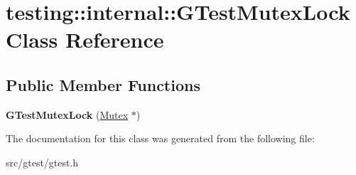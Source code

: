 \hypertarget{classtesting_1_1internal_1_1_g_test_mutex_lock}{}\section{testing\+:\+:internal\+:\+:G\+Test\+Mutex\+Lock Class Reference}
\label{classtesting_1_1internal_1_1_g_test_mutex_lock}
\subsection*{Public Member Functions}
\begin{DoxyCompactItemize}
\item 
\mbox{\label{classtesting_1_1internal_1_1_g_test_mutex_lock_a77e3cba326d5356b4a1dea3790559c26}} 
{\bfseries G\+Test\+Mutex\+Lock} (\mbox{\hyperlink{classtesting_1_1internal_1_1_mutex}{Mutex}} $\ast$)
\end{DoxyCompactItemize}


The documentation for this class was generated from the following file\+:\begin{DoxyCompactItemize}
\item 
src/gtest/gtest.\+h\end{DoxyCompactItemize}
